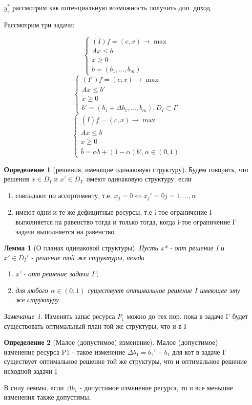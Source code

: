 \documentclass[a4paper]{article}
\newtheorem{lemma}{Лемма}[section]
\theoremstyle{definition}
\newtheorem*{definition}{Определение}
\theoremstyle{remark}
\newtheorem*{remark}{Замечание}
\begin{document}
$y_i^*$ рассмотрим как потенциальную возможность получить доп. доход.

Рассмотрим три задачи:

\[\begin{cases} (I)f = (c, x) \to \max \\ Ax\le b \\ x\ge 0 \\ b = (b_1, \dots, b_m) \end{cases}\]
\[\begin{cases} (I')f = (c, x) \to \max \\ Ax\le b' \\ x\ge 0 \\ b' = (b_1+\Delta b_1, \dots, b_m), D_I \subset I' \end{cases}\]
\[\begin{cases} (\overline{I})f = (c, x) \to \max \\ Ax\le \overline{b} \\ x\ge 0 \\ \overline{b} = \alpha b + (1- \alpha )b', \alpha \in (0, 1) \end{cases}\]

\begin{definition}[решения, имеющие одинаковую структуру]
    Будем говорить, что решения $x\in D_I$ и $x' \in D_{I'}$ имеют одинаковую структуру, если
    \begin{enumerate}
        \item совпадают по ассортименту, т.е. $x_j = 0 \Leftrightarrow {x_j}' = 0 j = 1, \dots, n$
        \item имеют одни и те же дефицитные ресурсы, т.е i-тое ограничение I выполняется на равенство тогда и только тогда, когда i-тое ограничение I' задачи выполняется на равенство
    \end{enumerate}
\end{definition}
\begin{lemma}[О планах одинаковой структуры]
    Пусть x* - опт решение I и $x' \in D_I'$ - решение той же структуры, тогда
    \begin{enumerate}
        \item x' - опт решение задачи I';
        \item для любого $\alpha \in (0, 1)$ существует оптимальное решение $\overline{I}$ имеющее эту же структуру
    \end{enumerate} 
\end{lemma}
\begin{remark}
    Изменять запас ресурса $P_1$ можно до тех пор, пока в задаче I' будет существовать оптимальный план той же структуры, что и в I
\end{remark}
\begin{definition}[Малое (допустимое) изменение]
    Малое (допустимое) изменение ресурса P1 - такое изменение $\Delta b_1 = b_1' - b_1$ для кот в задаче I' существует оптимальное решение той же структуры, что и оптимальное решение исходной задачи I
\end{definition}
В силу леммы, если $\Delta b_1$ - допустимое изменение ресурса, то и все меньшие изменения также допустимы.
\end{document}
